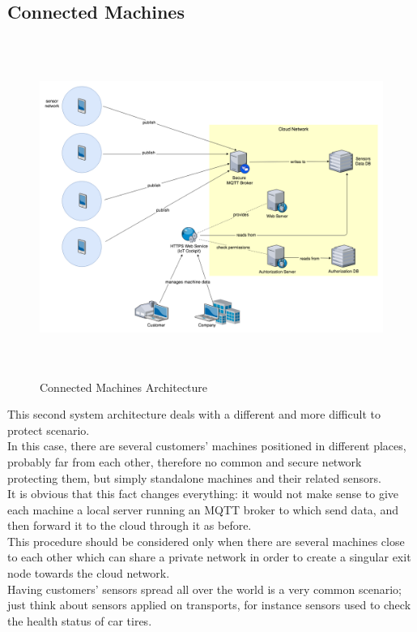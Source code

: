 \documentclass[12pt]{report}
\begin{document}
{\subsection{Connected Machines}

\begin{figure}[H]
\includegraphics[width=14cm,height=11cm,keepaspectratio]{connectedmachines_architecture}
\centering
\caption{Connected Machines Architecture}
\end{figure}

This second system architecture deals with a different and more difficult to protect scenario.\\
In this case, there are several customers' machines positioned in different places, probably far from each other, therefore no common and secure network protecting them, but simply standalone machines and their related sensors.\\
It is obvious that this fact changes everything: it would not make sense to give each machine a local server running an MQTT broker to which send data, and then forward it to the cloud through it as before.\\
This procedure should be considered only when there are several machines close to each other which can share a private network in order to create a singular exit node towards the cloud network.\\

Having customers' sensors spread all over the world is a very common scenario; just think about sensors applied on transports, for instance sensors used to check the health status of car tires.\\

}
\end{document}
